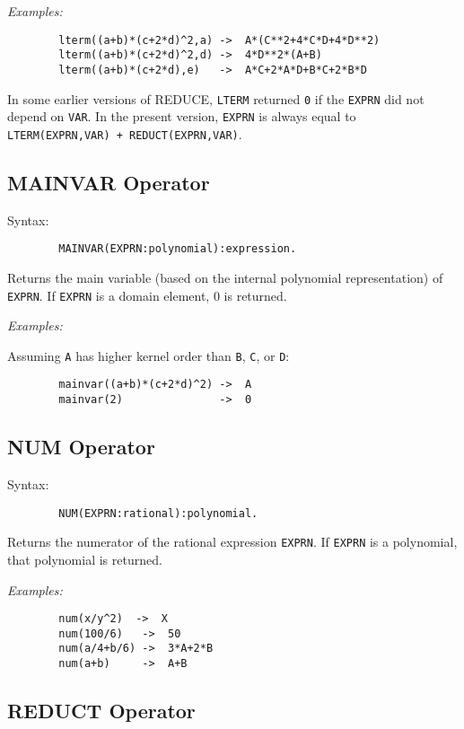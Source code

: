\textit{Examples:}
\begin{verbatim}
        lterm((a+b)*(c+2*d)^2,a) ->  A*(C**2+4*C*D+4*D**2)
        lterm((a+b)*(c+2*d)^2,d) ->  4*D**2*(A+B)
        lterm((a+b)*(c+2*d),e)   ->  A*C+2*A*D+B*C+2*B*D
\end{verbatim}

{\COMPATNOTE} In some earlier versions of REDUCE, \texttt{LTERM} returned
\texttt{0} if the \texttt{EXPRN} did not depend on \texttt{VAR}.  In the present
version, \texttt{EXPRN} is always equal to 
\texttt{LTERM(EXPRN,VAR) + REDUCT(EXPRN,VAR)}.

\subsection{MAINVAR Operator}
\hypertarget{operator:MAINVAR}{}

Syntax:
\begin{verbatim}
        MAINVAR(EXPRN:polynomial):expression.
\end{verbatim}
Returns the main variable (based on the internal polynomial representation)
of \texttt{EXPRN}. If \texttt{EXPRN} is a domain element, 0 is returned.

\textit{Examples:}

Assuming \texttt{A} has higher kernel order than \texttt{B}, \texttt{C}, or \texttt{D}:
\begin{verbatim}
        mainvar((a+b)*(c+2*d)^2) ->  A
        mainvar(2)               ->  0
\end{verbatim}

\subsection{NUM Operator}
\hypertarget{operator:NUM}{}

Syntax:
\begin{verbatim}
        NUM(EXPRN:rational):polynomial.
\end{verbatim}
Returns the numerator of the rational expression \texttt{EXPRN}.  If \texttt{EXPRN}
is a polynomial, that polynomial is returned.

\textit{Examples:}
\begin{verbatim}
        num(x/y^2)  ->  X
        num(100/6)   ->  50
        num(a/4+b/6) ->  3*A+2*B
        num(a+b)     ->  A+B
\end{verbatim}

\subsection{REDUCT Operator}
\hypertarget{operator:REDUCT}{}

